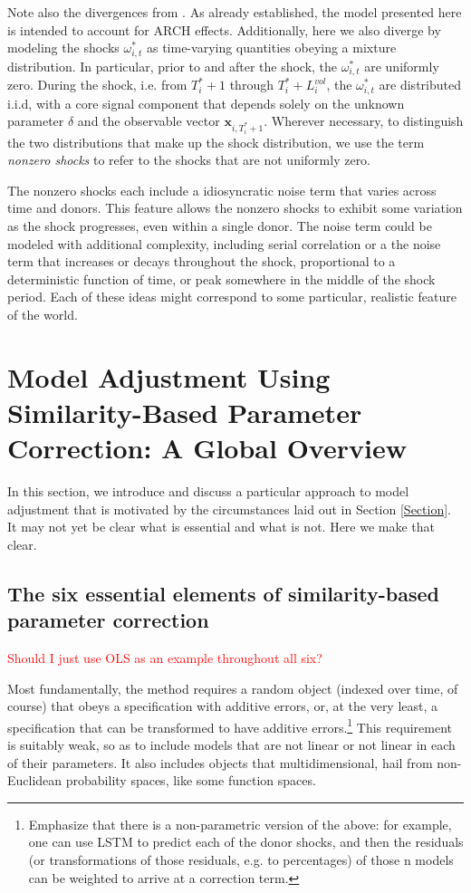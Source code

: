 \documentclass[11pt]{article}
\newcommand{\x}{\textbf{x}}
\theoremstyle{definition}
\begin{document}
    
Note also the divergences from \cite{lin2021minimizing}.  As already established, the model presented here is intended to account for ARCH effects.  Additionally, here we also diverge by modeling the shocks $\omega^{*}_{i,t}$ as time-varying quantities obeying a mixture distribution.  In particular, prior to and after the shock, the  $\omega^{*}_{i,t}$  are uniformly zero.  During the shock, i.e. from $T^{*}_{i}+1$ through $T^{*}_{i}+L^{vol}_{i}$, the $\omega^{*}_{i,t}$ are distributed i.i.d, with a core signal component that depends solely on the unknown parameter $\delta$ and the observable vector $\x_{i,T_{i}^{*}+1}$.  Wherever necessary, to distinguish the two distributions that make up the shock distribution, we use the term \textit{nonzero shocks} to refer to the shocks that are not uniformly zero.  

The nonzero shocks each include a idiosyncratic noise term that varies across time and donors.  This feature allows the nonzero shocks to exhibit some variation as the shock progresses, even within a single donor.  The noise term could be modeled with additional complexity, including serial correlation or a the noise term that increases or decays throughout the shock, proportional to a deterministic function of time, or peak somewhere in the middle of the shock period.  Each of these ideas might correspond to some particular, realistic feature of the world.


\section{Model Adjustment Using Similarity-Based Parameter Correction: A Global Overview}

In this section, we introduce and discuss a particular approach to model adjustment that is motivated by the circumstances laid out in Section \ref{Section}.  It may not yet be clear what is essential and what is not.  Here we make that clear.

\subsection{The six essential elements of similarity-based parameter correction
}

\textcolor{red}{Should I just use OLS as an example throughout all six?}

Most fundamentally, the method requires a random object (indexed over time, of course) that obeys a specification with additive errors, or, at the very least, a specification that can be transformed to have additive errors.\footnote{Emphasize that there is a non-parametric version of the above: for example, one can use LSTM to predict each of the donor shocks, and then the residuals (or transformations of those residuals, e.g. to percentages) of those n models can be weighted to arrive at a correction term.}  This requirement is suitably weak, so as to include models that are not linear or not linear in each of their parameters.  It also includes objects that multidimensional, hail from non-Euclidean probability spaces, like some function spaces.
\end{document}

